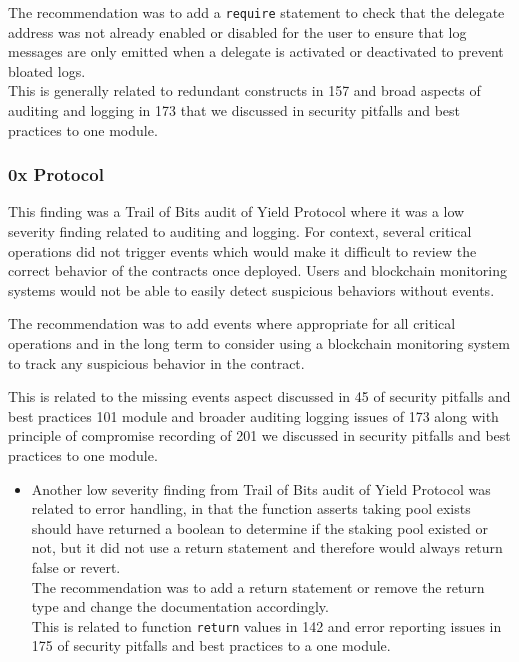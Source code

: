 \begin{itemize}
  The recommendation was to add a \texttt{require} statement to check
  that the delegate address was not already enabled or disabled for the
  user to ensure that log messages are only emitted when a delegate is
  activated or deactivated to prevent bloated logs.\\

  This is generally related to redundant constructs in 157 and broad
  aspects of auditing and logging in 173 that we discussed in security
  pitfalls and best practices to one module.
\end{itemize}

\subsubsection{0x Protocol}\label{x-protocol}

This finding was a Trail of Bits audit of Yield Protocol where it was a
low severity finding related to auditing and logging. For context,
several critical operations did not trigger events which would make it
difficult to review the correct behavior of the contracts once deployed.
Users and blockchain monitoring systems would not be able to easily
detect suspicious behaviors without events.

The recommendation was to add events where appropriate for all critical
operations and in the long term to consider using a blockchain
monitoring system to track any suspicious behavior in the contract.

This is related to the missing events aspect discussed in 45 of security
pitfalls and best practices 101 module and broader auditing logging
issues of 173 along with principle of compromise recording of 201 we
discussed in security pitfalls and best practices to one module.

\begin{itemize}
\item
  Another low severity finding from Trail of Bits audit of Yield
  Protocol was related to error handling, in that the function asserts
  taking pool exists should have returned a boolean to determine if the
  staking pool existed or not, but it did not use a return statement and
  therefore would always return false or revert.\\

  The recommendation was to add a return statement or remove the return
  type and change the documentation accordingly.\\

  This is related to function \texttt{return} values in 142 and error
  reporting issues in 175 of security pitfalls and best practices to a
  one module.
\end{itemize}

